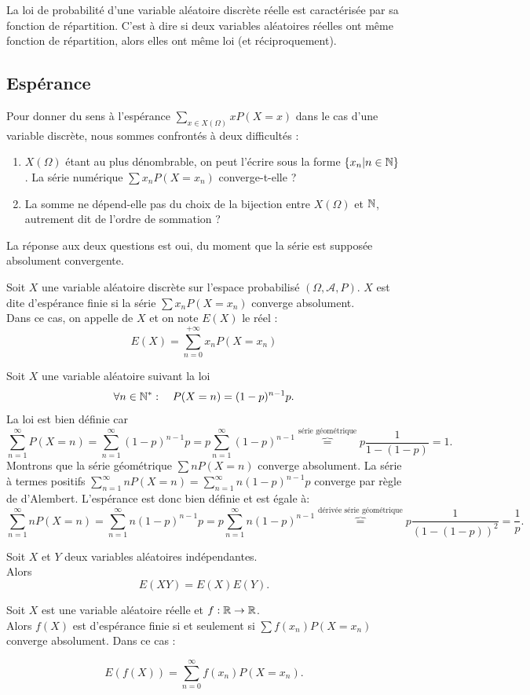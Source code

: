 \documentclass{book}
\begin{document}
\begin{Theoreme}
La loi de probabilité d'une variable aléatoire discrète réelle est caractérisée par sa fonction de répartition. C'est à dire si deux variables aléatoires réelles ont même fonction de répartition, alors elles ont même loi (et réciproquement).
\end{Theoreme}
\subsection{Espérance}
Pour donner du sens à l'espérance $\sum_{x\in X(\Omega)}x P(X = x )$ dans le cas d'une variable discrète, nous sommes confrontés à
deux difficultés :
\begin{enumerate}
\item  $X(\Omega)$ étant au plus dénombrable, on peut l'écrire sous la forme $\{x_n | n \in \mathbb{N}\}$. La série numérique $\sum x_n P(X = x_n )$ converge-t-elle ?
\item La somme ne dépend-elle pas du choix de la bijection entre $X(\Omega)$ et $\mathbb{N}$, autrement dit de l'ordre de
sommation ?
\end{enumerate}
La réponse aux deux questions est oui, du moment que la série est supposée absolument convergente.
\begin{Definition}
Soit $X$ une variable aléatoire discrète sur l'espace probabilisé $(\Omega,\mathcal{A},P)$. 
$X$ est dite d'espérance finie si la série $\sum x_n P(X = x_n )$ converge absolument.\\
Dans ce cas, on appelle  de $X$ et on note $E(X )$ le réel :
$$E(X ) =\sum_{n=0}^{+\infty} x_n P(X = x_n )$$
\end{Definition}
\begin{Exemple}
Soit $X$ une variable aléatoire suivant la loi $$\forall n\in \mathbb{N}^*:\quad  P(X=n)=(1-p)^{n-1}p.$$
La loi est bien définie car $$\sum\limits_{n=1}^{\infty}P(X=n)=\sum\limits_{n=1}^{\infty}(1-p)^{n-1}p=p\sum\limits_{n=1}^{\infty}(1-p)^{n-1}\overbrace{=}^{\text{série géométrique}}p\frac{1}{1-(1-p)}=1.$$ 
Montrons que la série géométrique  $\sum n P(X = n )$ converge absolument. La série à termes positifs $\sum\limits_{n=1}^{\infty}nP(X=n)=\sum\limits_{n=1}^{\infty}n(1-p)^{n-1}p$ converge par règle de d'Alembert. L'espérance est donc bien définie et est égale à:
$$\sum\limits_{n=1}^{\infty}nP(X=n)=\sum\limits_{n=1}^{\infty}n(1-p)^{n-1}p=p\sum\limits_{n=1}^{\infty}n(1-p)^{n-1}\overbrace{=}^{\text{dérivée série géométrique}}p\frac{1}{(1-(1-p))^2}=\frac{1}{p}.$$
\end{Exemple}
\begin{Theoreme}
Soit $X$ et $Y$ deux variables aléatoires indépendantes.\\
Alors \[ E(XY) = E(X) E(Y). \]
\end{Theoreme}
\begin{Theoreme}
Soit $X$ est une variable aléatoire réelle et $f:\mathbb{R}\to \mathbb{R}$.\\
Alors $f(X)$ est d'espérance finie si et seulement si $\sum f(x_n)P(X=x_n)$ converge absolument. Dans ce cas :

\[ E(f(X)) =  \sum_{n=0}^{\infty}  f(x_n) P(X=x_n). \]
\end{Theoreme}
\end{document}
